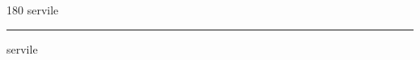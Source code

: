 
\begin{frame}
\begin{center}
\begin{turn}{180}
{\fontsize{2.5cm}{1em}\selectfont servile}
\end{turn}
\vspace{1em}\par  
\hrule
\vspace{1em}\par  
{\fontsize{2.5cm}{1em}\selectfont servile}
\end{center}
\end{frame}
